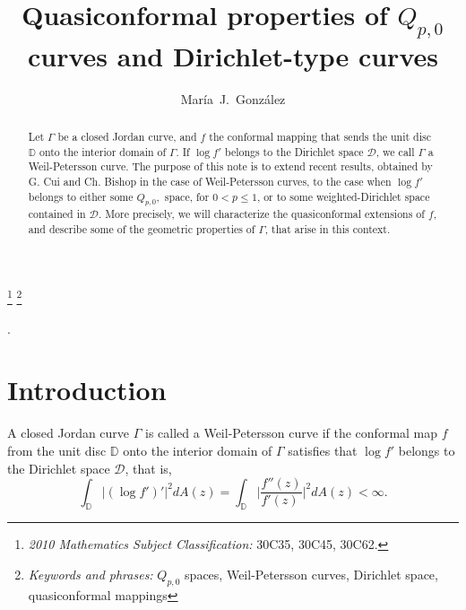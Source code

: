 \documentclass[12pt,a4paper]{article}
\title{Quasiconformal properties of $Q_{p,0}$ curves and Dirichlet-type curves}
\author{Mar\'ia\ J.\ Gonz\'alez}
\date{}
\theoremstyle{definition}
\theoremstyle{remark}
\newcommand{\D}{\mathbb{D}}
\numberwithin{komcounter}{section}
\begin{document}
	
	\maketitle
	
	\baselineskip=6mm
	\parskip=2.5mm
	\let\thefootnote\relax\footnote {\textit{2010 Mathematics Subject Classification:} 30C35, 30C45, 30C62.}
	\let\thefootnote\relax\footnote{\textit{Keywords and phrases:}  $Q_{p,0}$ spaces, Weil-Petersson curves, Dirichlet space, quasiconformal mappings}

	
	\begin{abstract}
	Let $\Gamma$ be a closed Jordan curve, and  $f$ the conformal mapping that sends the unit disc $\D$  onto the interior  domain of $\Gamma$. If $\log f'$ belongs to the  Dirichlet space $\mathcal{D}$, we call $\Gamma$ a Weil-Petersson curve. The purpose of this note is to  extend recent results, obtained by   G. Cui and  Ch. Bishop in the case of Weil-Petersson curves, to the case when  $\log f'$ belongs to either some $Q_{p,0},$ space, for  $0<p\leq 1$, or to some weighted-Dirichlet space contained in $\mathcal{D}$.  More precisely, we will characterize the quasiconformal extensions of $f$, and describe some  of the geometric properties of $\Gamma$, that arise in this context.

	\end{abstract}

	.  
	
	

	
	
	\section*{Introduction}	
	
	
	

	
	 A closed Jordan  curve $\Gamma$ is called a Weil-Petersson curve if the conformal map $f$ from the unit disc $\D$ onto the interior domain of $\Gamma$ satisfies that $\log{f'}$ belongs to the Dirichlet space $\mathcal{D}$, that is, 
	 $$
	 \int_{\D}| (\log f')'|^2 dA(z)=\int_{\D} \bigg\vert\frac{f''(z)}{f'(z)~}\bigg\vert^2 dA(z)<\infty.
	 $$
	 
\end{document}
